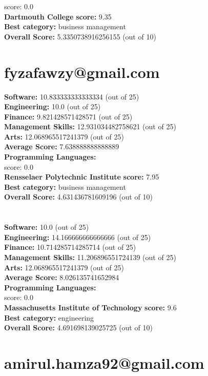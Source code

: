 \documentclass{article}
\begin{document}
score: 0.0\\
\textbf{Dartmouth College} \textbf{score:} 9.35\\
\textbf{Best category: } business management\\
\textbf{Overall Score: }5.3350738916256155 (out of 10)\section{fyzafawzy@gmail.com}
\textbf{Software:} 10.833333333333334 (out of 25)\\
\textbf{Engineering: } 10.0 (out of 25)\\
\textbf{Finance:} 9.821428571428571 (out of 25)\\
\textbf{Management Skills:} 12.931034482758621 (out of 25)\\
\textbf{Arts:} 12.068965517241379 (out of 25)\\
\textbf{Average Score: } 7.638888888888889\\
\textbf{Programming Languages:} \\
score: 0.0\\
\textbf{Rensselaer Polytechnic Institute} \textbf{score:} 7.95\\
\textbf{Best category: } business management\\
\textbf{Overall Score: }4.631436781609196 (out of 10)\section{}
\textbf{Software:} 10.0 (out of 25)\\
\textbf{Engineering: } 14.166666666666666 (out of 25)\\
\textbf{Finance:} 10.714285714285714 (out of 25)\\
\textbf{Management Skills:} 11.206896551724139 (out of 25)\\
\textbf{Arts:} 12.068965517241379 (out of 25)\\
\textbf{Average Score: } 8.026135741652984\\
\textbf{Programming Languages:} \\
score: 0.0\\
\textbf{Massachusetts Institute of Technology} \textbf{score:} 9.6\\
\textbf{Best category: } engineering\\
\textbf{Overall Score: }4.691698139025725 (out of 10)\section{amirul.hamza92@gmail.com}
\end{document}
